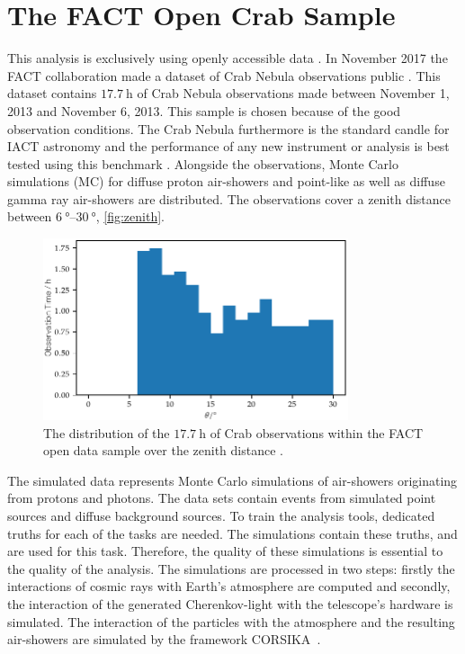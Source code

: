\chapter{The FACT Open Crab Sample}
%
This analysis is exclusively using openly accessible data \cite{fact-data}. In November 2017 the
FACT collaboration made a dataset of Crab Nebula observations public
\cite{FACT-Design, FACT-Calib}. This dataset contains $\SI{17.7}{\hour}$
of Crab Nebula observations made between November 1, 2013 and November 6, 2013.
This sample is chosen because of the good observation conditions. The Crab Nebula furthermore is the standard candle for IACT astronomy and the performance of any new instrument or analysis is best tested using this benchmark \cite{holder}. Alongside the
observations, Monte Carlo simulations (MC) for diffuse proton air-showers and point-like
as well as diffuse gamma ray air-showers are distributed. The observations
cover a zenith distance between $\SIrange{6}{30}{\degree}$, \autoref{fig:zenith}.
%
\begin{figure}
  \centering%
  \includegraphics[width=0.8\textwidth]{Plots/zenith.pdf}%
  \caption{The distribution of the $\SI{17.7}{\hour}$ of Crab observations within the FACT open data sample over the zenith distance \cite{fact-data}.}%
  \label{fig:zenith}%
\end{figure}
%
The simulated data represents Monte Carlo simulations of air-showers
originating from protons and photons. The data sets contain events from
simulated point sources and diffuse background sources. To train the analysis
tools, dedicated truths for each of the tasks are needed. The simulations
contain these truths, and are used for this task. Therefore, the quality of
these simulations is essential to the quality of the analysis. The simulations
are processed in two steps: firstly the interactions of cosmic rays with Earth's
atmosphere are computed and secondly, the interaction of the generated Cherenkov-light with the telescope's hardware is simulated. The interaction of the particles with the atmosphere and the resulting air-showers are simulated by the framework CORSIKA~\cite{CORSIKA}.

